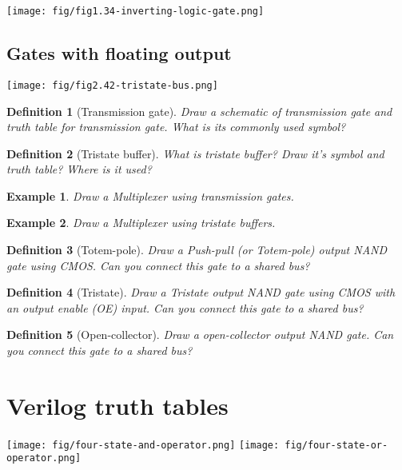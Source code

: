 \documentclass{article}
\newtheorem{example}{Example}
\newtheorem{definition}{Definition}
\begin{document}
\texttt{[image: fig/fig1.34-inverting-logic-gate.png]}

\subsection{Gates with floating output}
\texttt{[image: fig/fig2.42-tristate-bus.png]}

\begin{definition}[Transmission gate]
  Draw a schematic of transmission gate and truth table for transmission gate.
  What is its commonly used symbol?
\end{definition}
\vspace{10em}


\begin{definition}[Tristate buffer]
  What is tristate buffer? Draw it's symbol and truth table? Where is it used?
\end{definition}
\vspace{10em}

\begin{example}
Draw a Multiplexer using transmission gates.
\end{example}
\vspace{10em}

\begin{example}
  Draw a Multiplexer using tristate buffers.
\end{example}
\vspace{10em}


\begin{definition}[Totem-pole]
  Draw a Push-pull (or Totem-pole) output NAND gate using CMOS. Can you connect
  this gate to a shared bus?
\end{definition}
\vspace{10em}

\begin{definition}[Tristate]
  Draw a Tristate output NAND gate using CMOS with an output enable (OE) input.
  Can you connect this gate to a shared bus?
\end{definition}
\vspace{10em}

\begin{definition}[Open-collector]
  Draw a open-collector output NAND gate. Can you connect this gate to a shared bus?
\end{definition}
\vspace{10em}

\section{Verilog truth tables}

\texttt{[image: fig/four-state-and-operator.png]}
\texttt{[image: fig/four-state-or-operator.png]}


%
%
\end{document}
